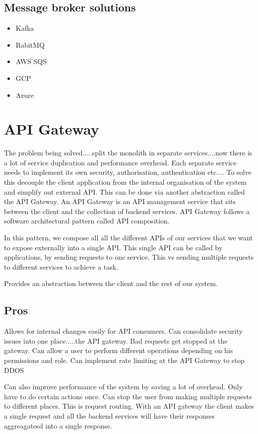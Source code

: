 \subsection{Message broker solutions}
\begin{itemize}
    \item Kafka
    \item RabitMQ
    \item AWS SQS
    \item GCP
    \item Azure %
\end{itemize}


\section{API Gateway}
The problem being solved.....split the monolith in separate services....now there is a lot of service duplication and performance overhead.
Each separate service needs to implement its own security, authorisation, authentication etc....
To solve this decouple the client application from the internal organisation of the system and simplify out external API.
This can be done via another abstraction called the API Gateway.
An API Gateway is an API management service that sits between the client and the collection of backend services.
API Gateway follows a software architectural pattern called API composition.

In this pattern, we compose all all the different APIs of our services that we want to expose externally into a single API.
This single API can be called by applications, by sending requests to one service.
This vs sending multiple requests to different services to achieve a task.

Provides an abstraction between the client and the rest of our system.

\subsection{Pros}
Allows for internal changes easily for API consumers.
Can consolidate security issues into one place.....the API gateway.
Bad requests get stopped at the gateway.
Can allow a user to perform different operations depending on his permissions and role.
Can implement rate limiting at the API Gateway to stop DDOS

Can also improve performance of the system by saving a lot of overhead.
Only have to do certain actions once.
Can stop the user from making multiple requests to different places.
This is request routing.
With an API gateway the client makes a single request and all the backend services will have their responses aggreagatesd into a single response.

